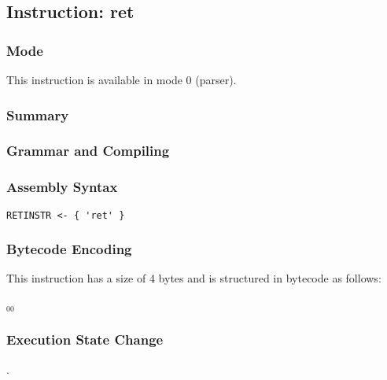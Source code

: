 \subsection{Instruction: ret}

\subsubsection{Mode}
This instruction is available in mode 0 (parser).
\subsubsection{Summary}


\subsubsection{Grammar and Compiling}


\subsubsection{Assembly Syntax}

\begin{myquote}
\begin{verbatim}
RETINSTR <- { 'ret' }
\end{verbatim}
\end{myquote}

\subsubsection{Bytecode Encoding}

This instruction has a size of 4 bytes and is structured in bytecode as follows:

$_{00}$\ 

\subsubsection{Execution State Change}

.



